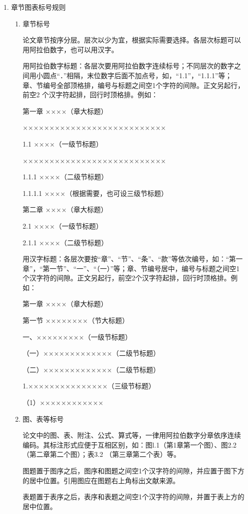 \documentclass[twoside,longtitle]{LZUthesis}
\begin{document}
\begin{enumerate}
\begin{enumerate}
\end{enumerate}
\item 章节图表标号规则

\begin{enumerate}
\item 章节标号


论文章节按序分层。层次以少为宜，根据实际需要选择。各层次标题可以用阿拉伯数字，也可以用汉字。


用阿拉伯数字标题：各层次要用阿拉伯数字连续标号；不同层次的数字之间用小圆点“．”相隔，末位数字后面不加点号，如，“1.1”，“1.1.1”等；章、节编号全部顶格排，编号与标题之间空1个字符的间隙。正文另起行，前空2 个汉字符起排，回行时顶格排。例如：


第一章 ××××（章大标题）


×××××××××××××××××××××××××××


1.1 ××××（一级节标题）


×××××××××××××××××××××××××××


1.1.1 ××××（二级节标题）


1.1.1.1 ××××（根据需要，也可设三级节标题）


第二章 ××××（章大标题）


2.1 ××××（一级节标题）


2.1.1 ××××（二级节标题）


用汉字标题：各层次要按“章”、“节”、“条”、“款”等依次编号，如：“第一章”，“第一节”、“一”、“（一）”等；章、节编号居中，编号与标题之间空1 个汉字符的间隙。正文另起行，前空2个汉字符起排，回行时顶格排。例如：


第一章 ××××（章大标题）


第一节 ××××××××（节大标题）


一、×××××××××（一级节标题）


（一）×××××××××××××（二级节标题）


（二）×××××××××××××（二级节标题）


1.×××××××××××××××（三级节标题）


（1）××××××××××××

\item 图、表等标号


论文中的图、表、附注、公式、算式等，一律用阿拉伯数字分章依序连续编码。其标注形式应便于互相区别，如：图l.1（第1章第一个图）、图2.2 （第二章第二个图）；表3.2 （第三章第二个表）等。


图题置于图序之后，图序和图题之间空1个汉字符的间隙，并应置于图下方的居中位置。引用图应在图题右上角标出文献来源。


表题置于表序之后，表序和表题之间空1个汉字符的间隙，并置于表上方的居中位置。


\end{enumerate}
\end{enumerate}
\end{document}
